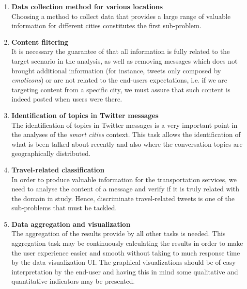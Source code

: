 \begin{enumerate}
	\item \textbf{Data collection method for various locations}\\
	Choosing a method to collect data that provides a large range of valuable information for different cities constitutes the first sub-problem.
	
	\item \textbf{Content filtering}\\
	It is necessary the guarantee of that all information is fully related to the target scenario in the analysis, as well as removing messages which does not brought additional information (for instance, tweets only composed by \textit{emoticons}) or are not related to the end-users expectations, i.e. if we are targeting content from a specific city, we must assure that such content is indeed posted when users were there.
	
	\item \textbf{Identification of topics in Twitter messages}\\
	The identification of topics in Twitter messages is a very important point in the analyses of the \textit{smart cities} context. This task allows the identification of what is been talked about recently and also where the conversation topics are geographically distributed.
	
	\item \textbf{Travel-related classification}\\
	In order to produce valuable information for the transportation services, we need to analyse the content of a message and verify if it is truly related with the domain in study. Hence, discriminate travel-related tweets is one of the sub-problems that must be tackled.
	
	\item \textbf{Data aggregation and visualization}\\
	The aggregation of the results provide by all other tasks is needed. This aggregation task may be continuously calculating the results in order to make the user experience easier and smooth without taking to much response time by the data visualization UI. The graphical visualizations should be of easy interpretation by the end-user and having this in mind some qualitative and quantitative indicators may be presented.
\end{enumerate}

